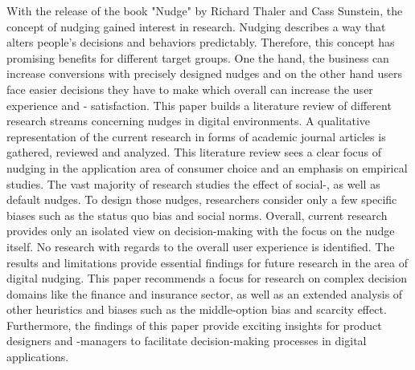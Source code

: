 With the release of the book "Nudge" by Richard Thaler and Cass Sunstein, the concept of nudging gained interest in research. Nudging describes a way that alters people's decisions and behaviors predictably. Therefore, this concept has promising benefits for different target groups. One the hand, the business can increase conversions with precisely designed nudges and on the other hand users face easier decisions they have to make which overall can increase the user experience and - satisfaction. This paper builds a literature review of different research streams concerning nudges in digital environments. A qualitative representation of the current research in forms of academic journal articles is gathered, reviewed and analyzed.
This literature review sees a clear focus of nudging in the application area of consumer choice and an emphasis on empirical studies. The vast majority of research studies the effect of social-, as well as default nudges. To design those nudges, researchers consider only a few specific biases such as the status quo bias and social norms. Overall, current research provides only an isolated view on decision-making with the focus on the nudge itself. No research with regards to the overall user experience is identified. The results and limitations provide essential findings for future research in the area of digital nudging. This paper recommends a focus for research on complex decision domains like the finance and insurance sector, as well as an extended analysis of other heuristics and biases such as the middle-option bias and scarcity effect. Furthermore, the findings of this paper provide exciting insights for product designers and -managers to facilitate decision-making processes in digital applications.
